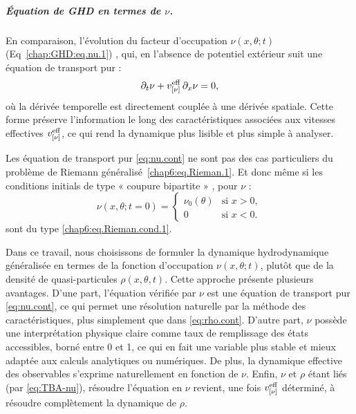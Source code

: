 \subparagraph{Équation de GHD en termes de $\nu$.}
En comparaison, l’évolution du facteur d'occupation $\nu(x,\theta;t)$ (Eq~\eqref{chap:GHD:eq.nu.1}) , qui, en l’absence de potentiel extérieur suit une équation de transport pur :
\begin{equation}
    \label{eq:nu.cont}
    \partial_t \nu + v^{\rm eff}_{[\nu]} \, \partial_x \nu = 0,
\end{equation}
où la dérivée temporelle est directement couplée à une dérivée spatiale. Cette forme préserve l'information le long des caractéristiques associées aux vitesses effectives $v^{\rm eff}_{[\nu]}$, ce qui rend la dynamique plus lisible et plus simple à analyser.

Les équation de transport pur \eqref{eq:nu.cont} ne sont pas  des cas particuliers du problème de Riemann généralisé~\eqref{chap6:eq.Rieman.1}. Et donc même si les conditions initials de type  « coupure bipartite » , pour $\nu$ :
\begin{equation}
    \label{eq:nu.cont.init}
    \nu(x,\theta;t=0) = 
    \begin{cases}
        \nu_0(\theta) & \text{si } x > 0, \\
        0 & \text{si } x < 0.
    \end{cases}
\end{equation}
sont du type \eqref{chap6:eq.Rieman.cond.1}.%

\medskip

Dans ce travail, nous choisissons de formuler la dynamique hydrodynamique généralisée en termes de la fonction d’occupation $\nu(x,\theta;t)$, plutôt que de la densité de quasi-particules $\rho(x,\theta,t)$. Cette approche présente plusieurs avantages. D’une part, l’équation vérifiée par $\nu$ est une équation de transport pur \eqref{eq:nu.cont}, ce qui permet une résolution naturelle par la méthode des caractéristiques, plus simplement que dans \eqref{eq:rho.cont}. D’autre part, $\nu$ possède une interprétation physique claire comme taux de remplissage des états accessibles, borné entre 0 et 1, ce qui en fait une variable plus stable et mieux adaptée aux calculs analytiques ou numériques.
De plus, la dynamique effective des observables s’exprime naturellement en fonction de $\nu$.
Enfin, $\nu$ et $\rho$ étant liés (par \eqref{eq:TBA-nu}), résoudre l’équation en $\nu$ revient, une fois $v^{\rm eff}_{[\nu]}$ déterminé, à résoudre complètement la dynamique de $\rho$.

